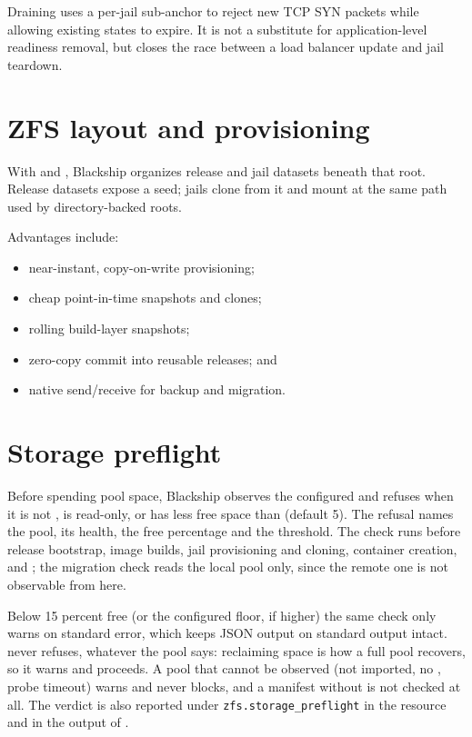 Draining uses a per-jail sub-anchor to reject new TCP SYN packets while allowing
existing states to expire. It is not a substitute for application-level
readiness removal, but closes the race between a load balancer update and jail
teardown.

\section{ZFS layout and provisioning}

With  and , Blackship
organizes release and jail datasets beneath that root. Release datasets expose a
 seed; jails clone from it and mount at the same
 path used by directory-backed roots.

Advantages include:

\begin{itemize}
  \item near-instant, copy-on-write provisioning;
  \item cheap point-in-time snapshots and clones;
  \item rolling build-layer snapshots;
  \item zero-copy commit into reusable releases; and
  \item native send/receive for backup and migration.
\end{itemize}

\section{Storage preflight}

Before spending pool space, Blackship observes the configured
 and refuses when it is not , is read-only, or
has less free space than  (default 5).
The refusal names the pool, its health, the free percentage and the threshold.
The check runs before release bootstrap, image builds, jail provisioning and
cloning, container creation, and ; the migration check reads
the local pool only, since the remote one is not observable from here.

Below 15 percent free (or the configured floor, if higher) the same check only
warns on standard error, which keeps JSON output on standard output intact.
 never refuses, whatever the pool says: reclaiming space is how a
full pool recovers, so it warns and proceeds. A pool that cannot be observed
(not imported, no , probe timeout) warns and never blocks, and a
manifest without  is not checked at all. The verdict is
also reported under \texttt{zfs.storage\_preflight} in the
 resource and in the output of .

